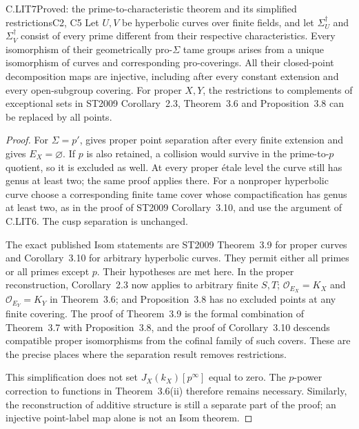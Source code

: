 \begin{claim}{C.LIT7}{Proved: the prime-to-characteristic theorem and its simplified restrictions}{C2, C5}
Let $U,V$ be hyperbolic curves over finite fields, and let
$\Sigma_U^\dagger$ and $\Sigma_V^\dagger$ consist of every prime
different from their respective characteristics. Every isomorphism
of their geometrically pro-$\Sigma$ tame groups arises from a unique
isomorphism of curves and corresponding pro-coverings. All their
closed-point decomposition maps are injective, including after
every constant extension and every open-subgroup covering. For
proper $X,Y$, the restrictions to complements of exceptional sets
in ST2009 Corollary~2.3, Theorem~3.6 and Proposition~3.8 can be
replaced by all points.
\end{claim}
\begin{proof}
For $\Sigma=p'$,  gives proper point
separation after every finite extension and
 gives $E_X=\varnothing$. If $p$ is also
retained, a collision would survive in the prime-to-$p$ quotient,
so it is excluded as well. At every proper \'etale level the
curve still has genus at least two; the same proof applies there.
For a nonproper hyperbolic curve choose a corresponding finite
tame cover whose compactification has genus at least two, as in
the proof of ST2009 Corollary~3.10, and use the argument of
C.LIT6. The cusp separation is unchanged.

The exact published Isom statements are ST2009 Theorem~3.9
for proper curves and Corollary~3.10 for arbitrary hyperbolic
curves. They permit either all primes or all primes except $p$.
Their hypotheses are met here. In the proper reconstruction,
Corollary~2.3 now applies to arbitrary finite $S,T$;
$\mathcal O_{E_X}=K_X$ and $\mathcal O_{E_Y}=K_Y$ in
Theorem~3.6; and Proposition~3.8 has no excluded points at any
finite covering. The proof of Theorem~3.9 is the formal
combination of Theorem~3.7 with Proposition~3.8, and the proof
of Corollary~3.10 descends compatible proper isomorphisms from
the cofinal family of such covers. These are the precise places
where the separation result removes restrictions.
\citep[Corollary~2.3, Theorems~3.6--3.7, Proposition~3.8,
Theorem~3.9, Corollary~3.10]{LA_ST2009}

This simplification does not set $J_X(k_X)[p^\infty]$ equal
to zero. The $p$-power correction to functions in Theorem~3.6(ii)
therefore remains necessary. Similarly, the reconstruction of
additive structure is still a separate part of the proof; an
injective point-label map alone is not an Isom theorem.
\end{proof}

